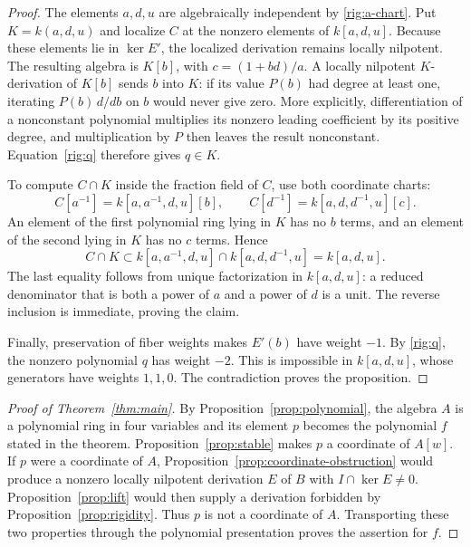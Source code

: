 \begin{proof}
The elements $a,d,u$ are algebraically independent by
\eqref{rig:a-chart}.  Put $K=k(a,d,u)$ and localize $C$ at the nonzero
elements of $k[a,d,u]$.  Because these elements lie in $\ker E'$, the
localized derivation remains locally nilpotent.  The resulting algebra is
$K[b]$, with $c=(1+bd)/a$.  A locally nilpotent $K$-derivation of $K[b]$
sends $b$ into $K$: if its value $P(b)$ had degree at least one, iterating
$P(b)\,d/db$ on $b$ would never give zero.  More explicitly, differentiation
of a nonconstant polynomial multiplies its nonzero leading coefficient
by its positive degree, and multiplication by $P$ then leaves the result
nonconstant.  Equation~\eqref{rig:q} therefore gives $q\in K$.

To compute $C\cap K$ inside the fraction field of $C$, use both coordinate
charts:
\[
 C[a^{-1}]=k[a,a^{-1},d,u][b],\qquad
 C[d^{-1}]=k[a,d,d^{-1},u][c].
\]
An element of the first polynomial ring lying in $K$ has no $b$ terms,
and an element of the second lying in $K$ has no $c$ terms.  Hence
\[
 C\cap K\subset
 k[a,a^{-1},d,u]\cap k[a,d,d^{-1},u]=k[a,d,u].
\]
The last equality follows from unique factorization in $k[a,d,u]$:
a reduced denominator that is both a power of $a$ and a power of $d$
is a unit.  The reverse inclusion is immediate, proving the claim.

Finally, preservation of fiber weights makes $E'(b)$ have weight $-1$.
By \eqref{rig:q}, the nonzero polynomial $q$ has weight $-2$.  This is
impossible in $k[a,d,u]$, whose generators have weights $1,1,0$.
The contradiction proves the proposition.
\end{proof}

\begin{proof}[Proof of Theorem~\ref{thm:main}]
By Proposition~\ref{prop:polynomial}, the algebra $A$ is a polynomial ring
in four variables and its element $p$ becomes the polynomial $f$ stated
in the theorem.  Proposition~\ref{prop:stable} makes $p$ a coordinate of
$A[w]$.  If $p$ were a coordinate of $A$,
Proposition~\ref{prop:coordinate-obstruction} would produce a nonzero
locally nilpotent derivation $E$ of $B$ with $I\cap\ker E\ne0$.
Proposition~\ref{prop:lift} would then supply a derivation forbidden by
Proposition~\ref{prop:rigidity}.  Thus $p$ is not a coordinate of $A$.
Transporting these two properties through the polynomial presentation
proves the assertion for $f$.
\end{proof}
